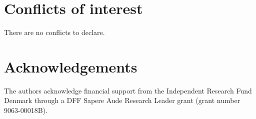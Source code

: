 \documentclass[twoside,twocolumn,9pt]{article}
\renewcommand{\refname}{Notes and references}
\begin{document}
\section*{Conflicts of interest}
There are no conflicts to declare.

\section*{Acknowledgements}
The authors acknowledge financial support from the Independent Research Fund Denmark through a DFF Sapere Aude Research Leader grant (grant number 9063-00018B).





\balance


\end{document}
